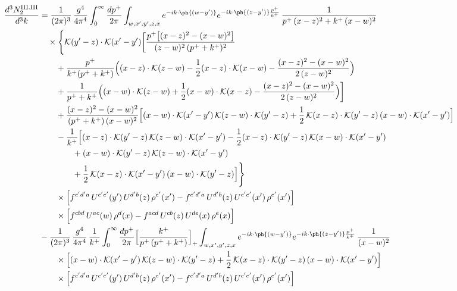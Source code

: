 \begin{align}
\frac{d^{3}N^{\rm III.III}_{2}}{d^{3}k} & =\frac{1}{(2\pi)^{3}}\,\frac{g^{4}}{4\pi^{4}}\int_{0}^{\infty}\frac{dp^{+}}{2\pi}\int_{w,x',y',z,x}e^{-ik\cdot\ph{(w-y')}}e^{-ik\cdot\ph{(z-y')}\frac{p^{+}}{k^{+}}}\,\frac{1}{p^{+}\,(x-z)^{2}+k^{+}\,(x-w)^{2}}\notag\\
&\quad\times\Bigg\{\mathcal{K}(y'-z)\cdot\mathcal{K}(x'-y')\bigg[\frac{p^{+}\big[(x-z)^{2}-(x-w)^{2}\big]}{(z-w)^{2}\,(p^{+}+k^{+})^{2}}\notag\\
&\qquad+\frac{p^{+}}{k^{+}(p^{+}+k^{+})}\Big((x-z)\cdot\mathcal{K}(z-w)-\frac{1}{2}(x-z)\cdot\mathcal{K}(x-w)-\frac{(x-z)^{2}-(x-w)^{2}}{2\,(z-w)^{2}}\Big)\notag\\
&\qquad+\frac{1}{p^{+}+k^{+}}\Big((x-w)\cdot\mathcal{K}(z-w)+\frac{1}{2}(x-w)\cdot\mathcal{K}(x-z)-\frac{(x-z)^{2}-(x-w)^{2}}{2\,(z-w)^{2}}\Big)\bigg]\notag\\
&\qquad+\frac{(x-z)^{2}-(x-w)^{2}}{(p^{+}+k^{+})\,(x-w)^{2}}\Big[(x-w)\cdot\mathcal{K}(x'-y')\,\mathcal{K}(z-w)\cdot\mathcal{K}(y'-z)+\frac{1}{2}\,\mathcal{K}(x-z)\cdot\mathcal{K}(y'-z)\,(x-w)\cdot\mathcal{K}(x'-y')\Big]\notag\\
&\qquad-\frac{1}{k^{+}}\Big[(x-z)\cdot\mathcal{K}(y'-z)\,\mathcal{K}(z-w)\cdot\mathcal{K}(x'-y')-\frac{1}{2}(x-z)\cdot\mathcal{K}(y'-z)\,\mathcal{K}(x-w)\cdot\mathcal{K}(x'-y')\notag\\
&\qquad\qquad+(x-w)\cdot\mathcal{K}(y'-z)\,\mathcal{K}(z-w)\cdot\mathcal{K}(x'-y')\notag\\
&\qquad\qquad+\frac{1}{2}\,\mathcal{K}(x-z)\cdot\mathcal{K}(x'-y')\,(x-w)\cdot\mathcal{K}(y'-z)\Big]\Bigg\}\notag\\
&\qquad\times\Big[f^{c'd'a}\,U^{c'e'}(y')\,U^{d'b}(z)\,\rho^{e'}(x')-f^{c'd'a}\,U^{d'b}(z)\,U^{c'e'}(x')\,\rho^{e'}(x')\Big]\notag\\
&\qquad\times\Big[f^{cbd}\,U^{ac}(w)\,\rho^{d}(x)-f^{acd}\,U^{cb}(z)\,U^{de}(x)\,\rho^{e}(x)\Big]\notag\\
&-\frac{1}{(2\pi)^{3}}\,\frac{g^{4}}{4\pi^{4}}\,\frac{1}{k^{+}}\int_{0}^{\infty}\frac{dp^{+}}{2\pi}\Big[\frac{k^{+}}{p^{+}\,(p^{+}+k^{+})}\Big]_{+}\int_{w,x',y',z,x}e^{-ik\cdot\ph{(w-y')}}e^{-ik\cdot\ph{(z-y')}\frac{p^{+}}{k^{+}}}\,\frac{1}{(x-w)^{2}}\notag\\
&\qquad\times\Big[(x-w)\cdot\mathcal{K}(x'-y')\,\mathcal{K}(z-w)\cdot\mathcal{K}(y'-z)+\frac{1}{2}\,\mathcal{K}(x-z)\cdot\mathcal{K}(y'-z)\,(x-w)\cdot\mathcal{K}(x'-y')\Big]\notag\\
&\qquad\times\Big[f^{c'd'a}\,U^{c'e'}(y')\,U^{d'b}(z)\,\rho^{e'}(x')-f^{c'd'a}\,U^{d'b}(z)\,U^{c'e'}(x')\,\rho^{e'}(x')\Big]\notag\\

\end{align}

